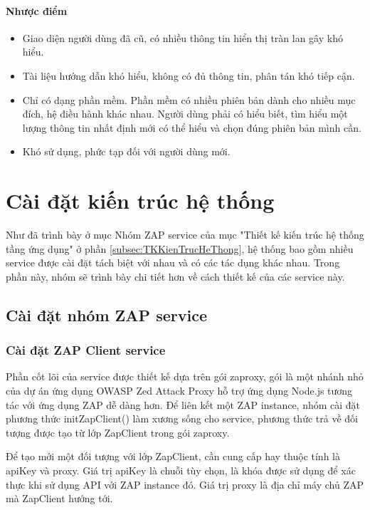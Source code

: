 \paragraph{Nhược điểm}
\begin{itemize}
  \item Giao diện người dùng đã cũ, có nhiều thông tin hiển thị tràn lan gây khó hiểu.
  \item Tài liệu hướng dẫn khó hiểu, không có đủ thông tin, phân tán khó tiếp cận.
  \item Chỉ có dạng phần mềm. Phần mềm có nhiều phiên bản dành cho nhiều mục đích, hệ điều hành khác nhau. Người dùng phải có hiểu biết, tìm hiểu một lượng thông tin nhất định mới có thể hiểu và chọn đúng phiên bản mình cần.
  \item Khó sử dụng, phức tạp đối với người dùng mới.
\end{itemize}

\section{Cài đặt kiến trúc hệ thống}

\tab Như đã trình bày ở mục Nhóm ZAP service của mục "Thiết kế kiến trúc hệ thống tầng ứng dụng" ở phần \ref{subsec:TKKienTrucHeThong}, hệ thống bao gồm nhiều service được cài đặt tách biệt với nhau và có các tác dụng khác nhau. Trong phần này, nhóm sẽ trình bày chi tiết hơn về cách thiết kế của các service này.

\subsection{Cài đặt nhóm ZAP service} \label{subsec:CaiDatNhomZapService}

\subsubsection{Cài đặt ZAP Client service}

\tab Phần cốt lõi của service được thiết kế dựa trên gói zaproxy, gói là một nhánh nhỏ của dự án ứng dụng OWASP Zed Attack Proxy hỗ trợ ứng dụng Node.js tương tác với ứng dụng ZAP dễ dàng hơn. Để liên kết một ZAP instance, nhóm cài đặt phương thức initZapClient() làm xương sống cho service, phương thức trả về đối tượng được tạo từ lớp ZapClient trong gói zaproxy.

Để tạo mới một đối tượng với lớp ZapClient, cần cung cấp hay thuộc tính là apiKey và proxy. Giá trị apiKey là chuỗi tùy chọn, là khóa được sử dụng để xác thực khi sử dụng API với ZAP instance đó. Giá trị proxy là địa chỉ máy chủ ZAP mà ZapClient hướng tới.

